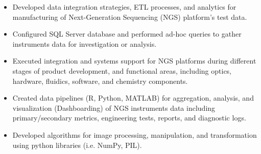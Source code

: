 \documentclass[10pt,a4paper]{altacv}
\begin{document}
\tagline{}

%

\begin{fullwidth}
\makecvheader
\end{fullwidth}

%





\begin{itemize}
    \item   \small{Developed data integration strategies, ETL processes, and analytics for manufacturing of Next-Generation Sequencing (NGS) platform's test data.}
    \item   \small{Configured SQL Server database and performed ad-hoc queries to gather instruments data for investigation or analysis.}
    \item   \small{Executed integration and systems support for NGS platforms during different stages of product development, and functional areas, including optics, hardware, fluidics, software, and chemistry components.}
    \item   \small{Created data pipelines (R, Python, MATLAB) for aggregation, analysis, and visualization (Dashboarding) of NGS instruments data including primary/secondary metrics, engineering tests, reports, and diagnostic logs.}
    \item   \small{Developed algorithms for image processing, manipulation, and transformation using python libraries (i.e. NumPy, PIL).}
\end{itemize}

\medskip

\end{document}
